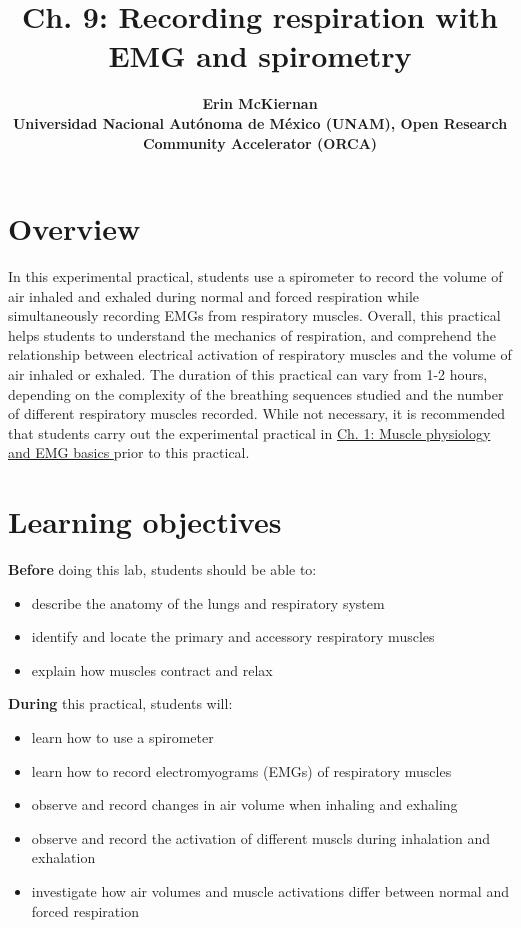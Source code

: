 \documentclass{article}
\title{Ch. 9: Recording respiration with EMG and spirometry}
\date{\displaydate{articleDate}}
\author{\bfseries Erin McKiernan\mdseries\\Universidad Nacional Autónoma de México (UNAM), Open Research Community Accelerator (ORCA)\\}
\begin{document}
\maketitle
\keywords{}

\section{Overview}

In this experimental practical, students use a spirometer to record the volume of air inhaled and exhaled during normal and forced respiration while simultaneously recording EMGs from respiratory muscles. Overall, this practical helps students to understand the mechanics of respiration, and comprehend the relationship between electrical activation of respiratory muscles and the volume of air inhaled or exhaled. The duration of this practical can vary from 1-2 hours, depending on the complexity of the breathing sequences studied and the number of different respiratory muscles recorded. While not necessary, it is recommended that students carry out the experimental practical in \href{https://curvenote.com/oxa:EPpXta8zJdzN048lz8AR/hZTnTYzQR5EQmCKX51Wj}{Ch. 1: Muscle physiology and EMG basics }prior to this practical.

\section{Learning objectives}

\textbf{Before} doing this lab, students should be able to:

\begin{itemize}
\item describe the anatomy of the lungs and respiratory system
\item identify and locate the primary and accessory respiratory muscles
\item explain how muscles contract and relax
\end{itemize}

\textbf{During} this practical, students will:

\begin{itemize}
\item learn how to use a spirometer
\item learn how to record electromyograms (EMGs) of respiratory muscles
\item observe and record changes in air volume when inhaling and exhaling
\item observe and record the activation of different muscls during inhalation and exhalation
\item investigate how air volumes and muscle activations differ between normal and forced respiration
\end{itemize}
\end{document}

